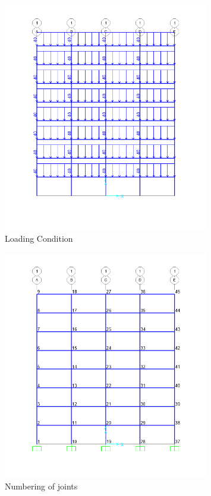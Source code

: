 \begin{figure}[H]
    \centering
    \includegraphics[width=0.8\textwidth]{weeks_new/imgs/exmp7_fig1.png}
    \caption{Loading Condition}
    \label{fig:loading}
\end{figure}

\begin{figure}[H]
    \centering
    \includegraphics[width=0.8\textwidth]{weeks_new/imgs/exmp7_fig3.png}
    \caption{Numbering of joints}
    \label{fig:joints}
\end{figure}

